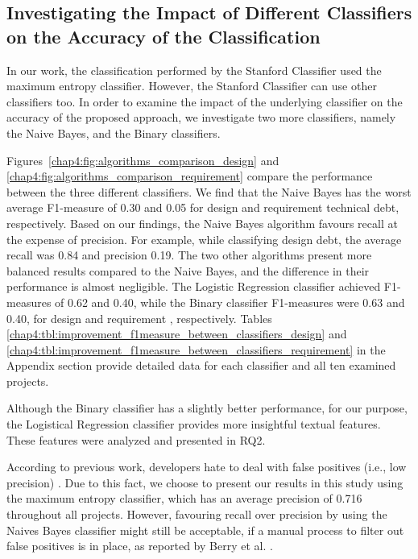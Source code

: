 \subsection{Investigating the Impact of Different Classifiers on the Accuracy of the Classification}
\label{chap4:sec:underlying_classifier}
In our work, the classification performed by the Stanford Classifier used the maximum entropy classifier. However, the Stanford Classifier can use other classifiers too. In order to examine the impact of the underlying classifier on the accuracy of the proposed approach, we investigate two more classifiers, namely the Naive Bayes, and the Binary classifiers.
 
Figures~\ref{chap4:fig:algorithms_comparison_design} and \ref{chap4:fig:algorithms_comparison_requirement} compare the performance between the three different classifiers. We find that the Naive Bayes has the worst average F1-measure of 0.30 and 0.05 for design and requirement technical debt, respectively. Based on our findings, the Naive Bayes algorithm favours recall at the expense of precision. For example, while classifying design debt, the average recall was 0.84 and precision 0.19. The two other algorithms present more balanced results compared to the Naive Bayes, and the difference in their performance is almost negligible. The Logistic Regression classifier achieved F1-measures of 0.62 and 0.40, while the Binary classifier F1-measures were 0.63 and 0.40, for design and requirement \SATD, respectively. Tables \ref{chap4:tbl:improvement_f1measure_between_classifiers_design} and \ref{chap4:tbl:improvement_f1measure_between_classifiers_requirement} in the Appendix section provide detailed data for each classifier and all ten examined projects.

Although the Binary classifier has a slightly better performance, for our purpose, the Logistical Regression classifier provides more insightful textual features. These features were analyzed and presented in RQ2. 

According to previous work, developers hate to deal with false positives (i.e., low precision) \cite{Bessey2010FBL,Ernst2015FSE,Sadowski2015ICSE}. Due to this fact, we choose to present our results in this study using the maximum entropy classifier, which has an average precision of 0.716 throughout all projects. However, favouring recall over precision by using the Naives Bayes classifier might still be acceptable, if a manual process to filter out false positives is in place, as reported by Berry et al. \cite{Berry2012book}.

